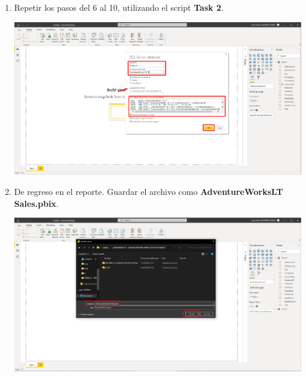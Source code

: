 \documentclass[12pt,letterpaper]{article}
\newcommand\tab[1][1cm]{\hspace*{#1}}
\begin{document}
\begin{enumerate}[\tab 1.]
\begin{center}
        \end{center}
        \item Repetir los pasos del 6 al 10, utilizando el script \textbf{Task 2}.
        \begin{center}
            \includegraphics[width=13cm]{./img/img12.png}
        \end{center}
        \item De regreso en el reporte. Guardar el archivo como \textbf{AdventureWorksLT Sales.pbix}.
        \begin{center}
            \includegraphics[width=13cm]{./img/img13.png}
        \end{center}
    \end{enumerate}
\end{document}
